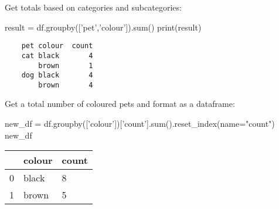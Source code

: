Get totals based on categories and subcategories:

\begin{pycode}
    result = df.groupby(['pet','colour']).sum()
    print(result)
\end{pycode}

\begin{verbatim}
    pet colour  count
    cat black       4
        brown       1
    dog black       4
        brown       4
\end{verbatim}

Get a total number of coloured pets and format as a dataframe:

\begin{pycode}
    new_df = df.groupby(['colour'])['count'].sum().reset_index(name="count")
    new_df
\end{pycode}

\begin{tabular}{l l l}
    &colour	&count \\
    \hline
    0	&black	&8 \\
    1	&brown	&5\\
\end{tabular}